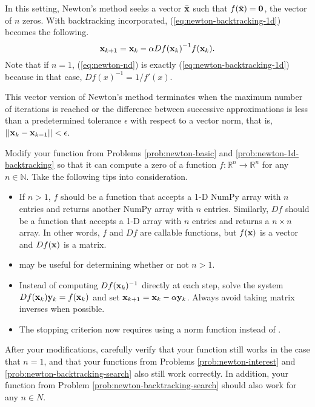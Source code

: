 In this setting, Newton's method seeks a vector $\bar{\mathbf{x}}$ such that $f(\bar{\mathbf{x}}) = \mathbf{0}$, the vector of $n$ zeros.
With backtracking incorporated, (\ref{eq:newton-backtracking-1d}) becomes the following.
\begin{equation}
\mathbf{x}_{k+1} = \mathbf{x}_k - \alpha{Df(\mathbf{x}_k)}^{-1}{f(\mathbf{x}_k)}.
\label{eq:newton-nd}
\end{equation}
Note that if $n = 1$, (\ref{eq:newton-nd}) is exactly (\ref{eq:newton-backtracking-1d}) because in that case, $Df(x)^{-1} = 1/f'(x)$.

This vector version of Newton's method terminates when the maximum number of iterations is reached or the difference between successive approximations is less than a predetermined tolerance $\epsilon$ with respect to a vector norm, that is, $||\mathbf{x}_k - \mathbf{x}_{k-1}|| < \epsilon$.

\begin{problem} %
Modify your function from Problems \ref{prob:newton-basic} and \ref{prob:newton-1d-backtracking} so that it can compute a zero of a function $f:\mathbb{R}^n\rightarrow\mathbb{R}^n$ for any $n\in\mathbb{N}$.
Take the following tips into consideration.
\begin{itemize}
\item If $n > 1$, $f$ should be a function that accepts a 1-D NumPy array with $n$ entries and returns another NumPy array with $n$ entries.
Similarly, $Df$ should be a function that accepts a 1-D array with $n$ entries and returns a $n\times n$ array.
In other words, $f$ and $Df$ are callable functions, but $f(\mathbf{x})$ is a vector and $Df(\mathbf{x})$ is a matrix.

\item {} may be useful for determining whether or not $n > 1$.

\item Instead of computing $Df(\mathbf{x}_k)^{-1}$ directly at each step, solve the system $Df(\mathbf{x}_k)\mathbf{y}_k = f(\mathbf{x}_k)$ and set $\mathbf{x}_{k+1} = \mathbf{x}_k - \alpha\mathbf{y}_k$.
Always avoid taking matrix inverses when possible.

\item The stopping criterion now requires using a norm function instead of .
\end{itemize}

After your modifications, carefully verify that your function still works in the case that $n=1$, and that your functions from Problems \ref{prob:newton-interest} and \ref{prob:newton-backtracking-search} also still work correctly.
In addition, your function from Problem \ref{prob:newton-backtracking-search} should also work for any $n \in N$.
\label{prob:newton-nd-implementation}
\end{problem}

